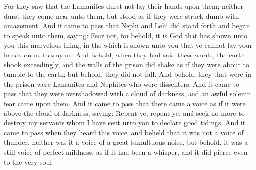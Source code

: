 For they saw that the Lamanites durst not lay their hands upon them; neither durst they come near unto them, but stood as if they were struck dumb with amazement.
\bverse \iffalse And it came to pass that Nephi and Lehi did stand forth and began to speak unto them, saying: Fear not, for behold, it is God that has shown unto you this marvelous thing, in the which is shown unto you that ye cannot lay your hands on us to slay us. \fi
And it came to pass that Nephi and Lehi did stand forth and began to speak unto them, saying: Fear not, for behold, it is God that has shown unto you this marvelous thing, in the which is shown unto you that ye cannot lay your hands on us to slay us.
\bverse \iffalse And behold, when they had said these words, the earth shook exceedingly, and the walls of the prison did shake as if they were about to tumble to the earth; but behold, they did not fall.  And behold, they that were in the prison were Lamanites and Nephites who were dissenters. \fi
And behold, when they had said these words, the earth shook exceedingly, and the walls of the prison did shake as if they were about to tumble to the earth; but behold, they did not fall.  And behold, they that were in the prison were Lamanites and Nephites who were dissenters.
\bverse \iffalse And it came to pass that they were overshadowed with a cloud of darkness, and an awful solemn fear came upon them. \fi
And it came to pass that they were overshadowed with a cloud of darkness, and an awful solemn fear came upon them.
\bverse \iffalse And it came to pass that there came a voice as if it were above the cloud of darkness, saying: Repent ye, repent ye, and seek no more to destroy my servants whom I have sent unto you to declare good tidings. \fi
And it came to pass that there came a voice as if it were above the cloud of darkness, saying: Repent ye, repent ye, and seek no more to destroy my servants whom I have sent unto you to declare good tidings.
\bverse \iffalse And it came to pass when they heard this voice, and beheld that it was not a voice of thunder, neither was it a voice of a great tumultuous noise, but behold, it was a still voice of perfect mildness, as if it had been a whisper, and it did pierce even to the very soul-- \fi
And it came to pass when they heard this voice, and beheld that it was not a voice of thunder, neither was it a voice of a great tumultuous noise, but behold, it was a still voice of perfect mildness, as if it had been a whisper, and it did pierce even to the very soul--
